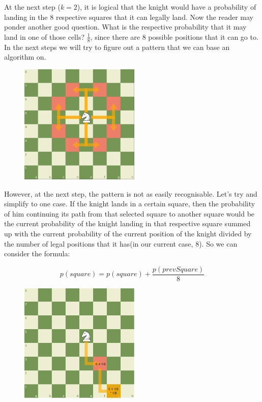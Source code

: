 \documentclass[letterpaper]{article}
\begin{document}
At the next step ($k = 2$), it is logical that the knight would have a probability of landing in the 8 respective squares that it can legally land. Now the reader may ponder another good question. What is the respective probability that it may land in one of those cells? $\frac{1}{8}$, since there are $8$ possible positions that it can go to. In the next steps we will try to figure out a pattern that we can base an algorithm on.

\newpage

\begin{figure} [h!]
\centering
\includegraphics[width=0.51\textwidth]{pngOfDiagrams/knighttwo.png}
\end{figure}

However, at the next step, the pattern is not as easily recognisable. Let's try and simplify to one case. If the knight lands in a certain square, then the probability of him continuing its path from that selected square to another square would be the current probability of the knight landing in that respective square summed up with the current probability of the current position of the knight divided by the number of legal positions that it has(in our current case, 8). So we can consider the formula: 

$$p(square) = p(square) + \frac{p(prevSquare)}{8}$$

\begin{figure} [h!]
\centering
\includegraphics[width=0.51\textwidth]{pngOfDiagrams/kngihtthree.png}
\end{figure}
\end{document}
